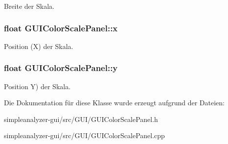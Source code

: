 Breite der Skala. \hypertarget{classGUIColorScalePanel_a41599e2046e6766d5276c95d4aa54ad3}{
\subsubsection[{x}]{\setlength{\rightskip}{0pt plus 5cm}float G\-U\-I\-Color\-Scale\-Panel\-::x\hspace{0.3cm}{\ttfamily [private]}}}\label{classGUIColorScalePanel_a41599e2046e6766d5276c95d4aa54ad3}
Position (X) der Skala. \hypertarget{classGUIColorScalePanel_a5a33f7666c1c49ca8cfe2e4de3dd06e0}{
\subsubsection[{y}]{\setlength{\rightskip}{0pt plus 5cm}float G\-U\-I\-Color\-Scale\-Panel\-::y\hspace{0.3cm}{\ttfamily [private]}}}\label{classGUIColorScalePanel_a5a33f7666c1c49ca8cfe2e4de3dd06e0}
Position Y) der Skala. 

Die Dokumentation für diese Klasse wurde erzeugt aufgrund der Dateien\-:\begin{DoxyCompactItemize}
\item 
simpleanalyzer-\/gui/src/\-G\-U\-I/G\-U\-I\-Color\-Scale\-Panel.\-h\item 
simpleanalyzer-\/gui/src/\-G\-U\-I/G\-U\-I\-Color\-Scale\-Panel.\-cpp\end{DoxyCompactItemize}
